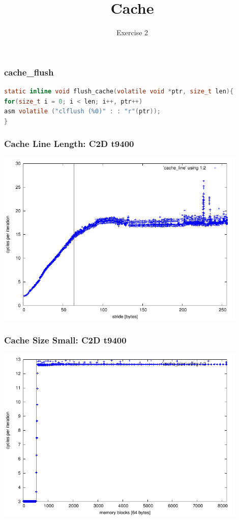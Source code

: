 \documentclass{beamer}
\title{Cache}
\subtitle{Exercise 2}
\author{\theauthor}
\date{\thedate}
\begin{document}
\frame{
	\titlepage
}


\begin{frame}[fragile]
  \frametitle{cache\_flush}
  
\begin{lstlisting}[language=c,style=customc]
static inline void flush_cache(volatile void *ptr, size_t len){
for(size_t i = 0; i < len; i++, ptr++)
asm volatile ("clflush (%0)" : : "r"(ptr));
}
\end{lstlisting}
  
\end{frame}


\begin{frame}[fragile]
	\frametitle{Cache Line Length: C2D t9400}
	\includegraphics[width=0.9\textwidth]{../c2d_t9400/cache_line.pdf}
\end{frame}

\begin{frame}[fragile]
	\frametitle{Cache Size Small: C2D t9400}
	\includegraphics[width=0.9\textwidth]{../c2d_t9400/cache_size_small.pdf}
\end{frame}
\end{document}
